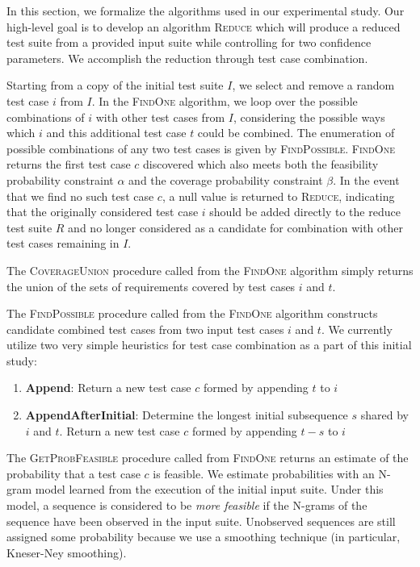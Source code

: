 In this section, we formalize the algorithms used in our experimental study.
Our high-level goal is to develop an algorithm \textsc{Reduce} which will produce
a reduced test suite from a provided input suite while controlling for two confidence
parameters. We accomplish the reduction through test case combination.

Starting from a copy of the initial test suite $I$, we select and remove a random test case
$i$ from $I$. In the \textsc{FindOne} algorithm, we loop over the possible combinations of 
$i$ with other test cases from $I$, considering the possible ways which $i$ and this additional
test case $t$ could be combined. The enumeration of possible combinations of any two test cases
is given by \textsc{FindPossible}. \textsc{FindOne} returns the first test case $c$ discovered which also
meets both the feasibility probability constraint $\alpha$ and the coverage probability constraint $\beta$.
In the event that we find no such test case $c$, a null value is returned to \textsc{Reduce}, indicating
that the originally considered test case $i$ should be added directly to the reduce test suite $R$ and
no longer considered as a candidate for combination with other test cases remaining in $I$.

The \textsc{CoverageUnion} procedure called from the \textsc{FindOne} algorithm simply returns the
union of the sets of requirements covered by test cases $i$ and $t$.

The \textsc{FindPossible} procedure called from the \textsc{FindOne} algorithm constructs candidate
combined test cases from two input test cases $i$ and $t$. We currently utilize two very simple heuristics for
test case combination as a part of this initial study:

\begin{enumerate}
	\item \textbf{Append}: Return a new test case $c$ formed by appending $t$ to $i$
	\item \textbf{AppendAfterInitial}: Determine the longest initial subsequence $s$ shared by $i$ and $t$.
	Return a new test case $c$ formed by appending $t - s$ to $i$
\end{enumerate}

The \textsc{GetProbFeasible} procedure called from \textsc{FindOne} returns an estimate of the
probability that a test case $c$ is feasible. We estimate probabilities with an N-gram model learned
from the execution of the initial input suite. Under this model, a sequence is considered to be 
\textit{more feasible} if the N-grams of the sequence have been observed in the input suite. Unobserved
sequences are still assigned some probability because we use a smoothing technique (in particular,
Kneser-Ney smoothing).

